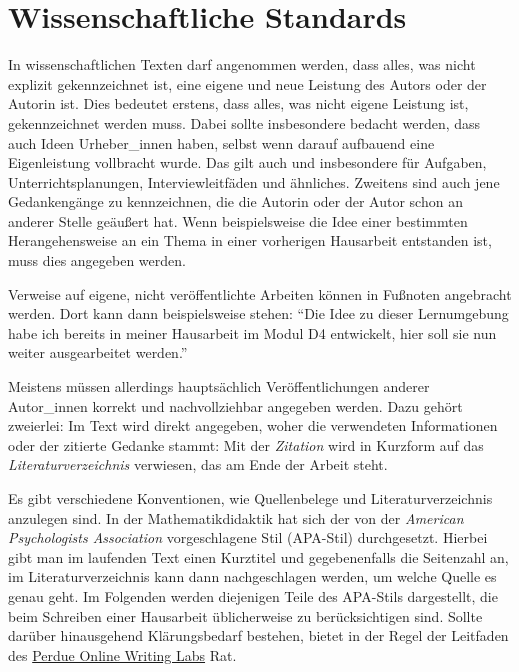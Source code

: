 \documentclass[
  bibliography=totoc,
  oneside,
  12pt,
  a4paper]{scrbook}
\begin{document}
\hypertarget{wissenschaftliche-standards}{%
\chapter{Wissenschaftliche Standards}\label{wissenschaftliche-standards}}

In wissenschaftlichen Texten darf angenommen werden, dass alles, was
nicht explizit gekennzeichnet ist, eine eigene und neue Leistung des
Autors oder der Autorin ist. Dies bedeutet erstens, dass alles, was
nicht eigene Leistung ist, gekennzeichnet werden muss. Dabei sollte
insbesondere bedacht werden, dass auch Ideen Urheber\_innen haben,
selbst wenn darauf aufbauend eine Eigenleistung vollbracht wurde. Das
gilt auch und insbesondere für Aufgaben, Unterrichtsplanungen,
Interviewleitfäden und ähnliches. Zweitens sind auch jene Gedankengänge
zu kennzeichnen, die die Autorin oder der Autor schon an anderer Stelle
geäußert hat. Wenn beispielsweise die Idee einer bestimmten
Herangehensweise an ein Thema in einer vorherigen Hausarbeit entstanden
ist, muss dies angegeben werden.

Verweise auf eigene, nicht veröffentlichte Arbeiten können in Fußnoten
angebracht werden. Dort kann dann beispielsweise stehen: ``Die Idee zu
dieser Lernumgebung habe ich bereits in meiner Hausarbeit im Modul D4
entwickelt, hier soll sie nun weiter ausgearbeitet werden.''

Meistens müssen allerdings hauptsächlich Veröffentlichungen anderer
Autor\_innen korrekt und nachvollziehbar angegeben werden. Dazu gehört
zweierlei: Im Text wird direkt angegeben, woher die verwendeten
Informationen oder der zitierte Gedanke stammt: Mit der \emph{Zitation} wird
in Kurzform auf das \emph{Literaturverzeichnis} verwiesen, das am Ende der
Arbeit steht.

Es gibt verschiedene Konventionen, wie Quellenbelege und
Literaturverzeichnis anzulegen sind. In der Mathematikdidaktik hat sich
der von der \emph{American Psychologists Association} vorgeschlagene Stil
(APA-Stil) durchgesetzt. Hierbei gibt man im laufenden Text einen
Kurztitel und gegebenenfalls die Seitenzahl an, im Literaturverzeichnis
kann dann nachgeschlagen werden, um welche Quelle es genau geht. Im
Folgenden werden diejenigen Teile des APA-Stils dargestellt, die beim
Schreiben einer Hausarbeit üblicherweise zu berücksichtigen sind. Sollte
darüber hinausgehend Klärungsbedarf bestehen, bietet in der Regel der
Leitfaden des \href{http://owl.english.purdue.edu/owl/section/2/10/}{Perdue Online Writing Labs} Rat.
\end{document}
